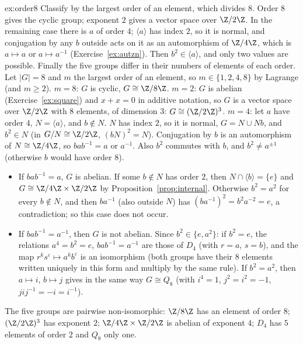 \begin{solution}{ex:order8}
\idea Classify by the largest order of an element, which divides $8$. Order $8$ gives the cyclic group; exponent $2$ gives a vector space over $\Z/2\Z$. In the remaining case there is $a$ of order $4$; $\langle a\rangle$ has index $2$, so it is normal, and conjugation by any $b$ outside acts on it as an automorphism of $\Z/4\Z$, which is $a\mapsto a$ or $a\mapsto a^{-1}$ (Exercise~\ref{ex:autzn}). Then $b^2\in\langle a\rangle$, and only two values are possible. Finally the five groups differ in their numbers of elements of each order.
\writeup Let $|G|=8$ and $m$ the largest order of an element, so $m\in\{1,2,4,8\}$ by Lagrange (and $m\ge2$).
\emph{$m=8$}: $G$ is cyclic, $G\cong\Z/8\Z$.
\emph{$m=2$}: $G$ is abelian (Exercise~\ref{ex:square}) and $x+x=0$ in additive notation, so $G$ is a vector space over $\Z/2\Z$ with $8$ elements, of dimension $3$: $G\cong(\Z/2\Z)^3$.
\emph{$m=4$}: let $a$ have order $4$, $N=\langle a\rangle$, and $b\notin N$. $N$ has index $2$, so it is normal, $G=N\cup Nb$, and $b^2\in N$ (in $G/N\cong\Z/2\Z$, $(bN)^2=N$). Conjugation by $b$ is an automorphism of $N\cong\Z/4\Z$, so $bab^{-1}=a$ or $a^{-1}$. Also $b^2$ commutes with $b$, and $b^2\ne a^{\pm1}$ (otherwise $b$ would have order $8$).
\begin{itemize}
\item If $bab^{-1}=a$, $G$ is abelian. If some $b\notin N$ has order $2$, then $N\cap\langle b\rangle=\{e\}$ and $G\cong\Z/4\Z\times\Z/2\Z$ by Proposition~\ref{prop:internal}. Otherwise $b^2=a^2$ for every $b\notin N$, and then $ba^{-1}$ (also outside $N$) has $(ba^{-1})^2=b^2a^{-2}=e$, a contradiction; so this case does not occur.
\item If $bab^{-1}=a^{-1}$, then $G$ is not abelian. Since $b^2\in\{e,a^2\}$: if $b^2=e$, the relations $a^4=b^2=e$, $bab^{-1}=a^{-1}$ are those of $D_4$ (with $r=a$, $s=b$), and the map $r^ks^\varepsilon\mapsto a^kb^\varepsilon$ is an isomorphism (both groups have their $8$ elements written uniquely in this form and multiply by the same rule). If $b^2=a^2$, then $a\mapsto i$, $b\mapsto j$ gives in the same way $G\cong Q_8$ (with $i^4=1$, $j^2=i^2=-1$, $jij^{-1}=-i=i^{-1}$).
\end{itemize}
The five groups are pairwise non-isomorphic: $\Z/8\Z$ has an element of order $8$; $(\Z/2\Z)^3$ has exponent $2$; $\Z/4\Z\times\Z/2\Z$ is abelian of exponent $4$; $D_4$ has $5$ elements of order $2$ and $Q_8$ only one.
\end{solution}

